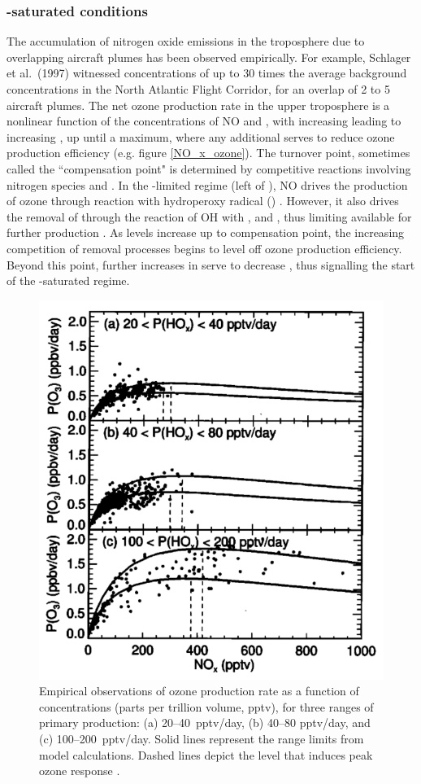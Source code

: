\subsubsection{-saturated conditions}
The accumulation of nitrogen oxide emissions in the troposphere due to overlapping aircraft plumes has been observed empirically. For example, Schlager et al.\ (1997) \cite{Schlager1997} witnessed  concentrations of up to 30 times the average background concentrations in the North Atlantic Flight Corridor, for an overlap of 2 to 5 aircraft plumes. The net ozone production rate in the upper troposphere is a nonlinear function of the concentrations of NO and , with increasing  leading to increasing , up until a maximum, where any additional  serves to reduce ozone production efficiency (e.g. figure \ref{NO_x_ozone}). The turnover point, sometimes called the ``compensation point" is determined by competitive reactions involving nitrogen species and . In the -limited regime (left of ), NO drives the production of ozone through reaction with hydroperoxy radical () \cite{Monks2005}. However, it also drives the removal of  through the reaction of OH with ,  and , thus limiting  available for further  production \cite{Wennberg1998}. As  levels increase up to compensation point, the increasing competition of  removal processes begins to level off ozone production efficiency. Beyond this point, further increases in  serve to decrease , thus signalling the start of the -saturated regime. 

\begin{figure}[H]
  \centering
  \includegraphics[width=0.5\linewidth]{Jaegle_sat.png}
  \caption{Empirical observations of ozone production rate as a function of  concentrations (parts per trillion volume, pptv), for three ranges of primary  production: (a) 20--40~pptv/day, (b) 40--80 pptv/day, and (c) 100--200~pptv/day. Solid lines represent the range limits from model calculations. Dashed lines depict the  level that induces peak ozone response \cite{Jaegle1999}.}
  \label{Jaegle_sat}
\end{figure}

